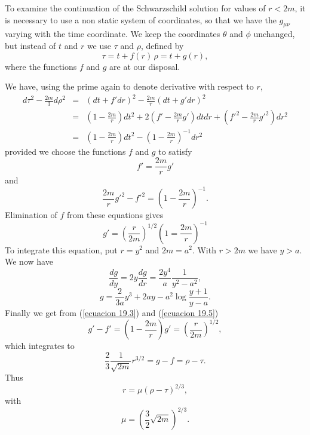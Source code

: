 To examine the continuation of the Schwarzschild solution for values of $r < 2 m$, it is necessary to use a non static 
system of coordinates, so that we have  the $g_{\mu\nu}$ varying with the time coordinate. We keep the coordinates 
$\theta$ and $\phi$ unchanged, but instead of $t$ and $r$ we use $\tau$ and $\rho$, defined by
\begin{equation}
 \label{ecuacion 19.1}
 \tau = t + f(r)\, \rho = t + g(r),
\end{equation}
where the functions $f$ and $g$ are at our disposal.

We have, using the prime again to denote derivative with respect to $r$,
\begin{equation}
 \label{ecuacion 19.2}
 \begin{array}{rcl}
   d\tau^2 - \frac{2 m}{3} d\rho^2 & = & (d t + f' dr)^2 - \frac{2 m}{r}(dt + g' dr)^2 \\
   & = & \left( 1 - \frac{2m}{r} \right)dt^2 + 2 \left( f' - \frac{2m}{r} g' \right) dt dr   
   + \left( f'^2 - \frac{2m}{r} g'^2 \right)dr^2\\
   & = & \left(1 - \frac{2m}{r}\right)dt^2 - \left(1 - \frac{2m}{r}\right)^{-1} dr^2
 \end{array}
\end{equation}
provided we choose the functions $f$ and $g$ to satisfy
\begin{equation}
 \label{ecuacion 19.3}
 f' = \frac{2 m}{r} g'
\end{equation}
and
\begin{equation}
 \label{ecuacion 19.4}
 \frac{2m}{r}g'^2 - f'^2 = \left(1 - \frac{2m}{r}\right)^{-1}.
\end{equation}
Elimination of $f$ from these equations gives
\begin{equation}
 \label{ecuacion 19.5}
 g' = \left( \frac{r}{2 m} \right)^{1/2} \left(
     1 = \frac{2 m}{r}
 \right)^{-1}
\end{equation}
To integrate this equation, put $r = y^2$ and $2 m = a^2$. With $r > 2m$ we have $y > a$. We now have
\[
  \frac{dg}{dy} = 2 y \frac{dg}{dr} = \frac{2 y^4}{a} \frac{1}{y^2 - a^2},
\]
\begin{equation}
 \label{ecuacion 19.6}
 g = \frac{2}{3a} y^3 + 2 a y - a^2 \log \frac{y + 1}{y - a}.
\end{equation}
Finally we get from (\ref{ecuacion 19.3}) and (\ref{ecuacion 19.5})
\[
g'-f' = \left( 1 - \frac{2 m }{r} \right) g' = \left(\frac{r}{2 m}\right)^{1/2},
\]
which integrates to 
\begin{equation}
 \label{ecuacion 19.7}
 \frac{2}{3} \frac{1}{\sqrt{2m}} r^{3/2} = g - f = \rho - \tau .
\end{equation}
Thus
\begin{equation}
 \label{ecuacion 19.8}
 r = \mu (\rho - \tau)^{2/3},
\end{equation}
with 
\[
\mu = \left(\frac{3}{2} \sqrt{2 m}\right)^{2/3}.
\]

